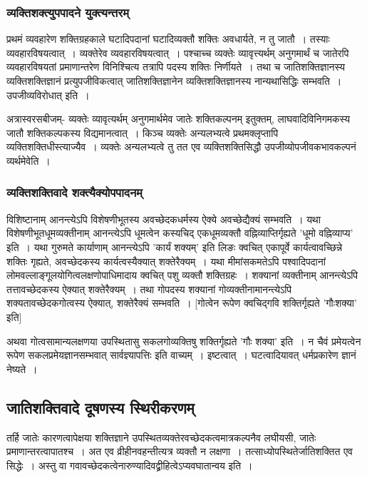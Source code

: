 			\subsubsection{व्यक्तिशक्त्युपपादने युक्त्यन्तरम्}

				प्रथमं व्यवहारेण शक्तिग्रहकाले घटादिपदानां घटादिव्यक्तौ शक्तिः अवधार्यते, न तु जातौ~। तस्याः व्यवहारविषयत्वात्~। व्यक्तेरेव व्यवहारविषयत्वात्~। पश्चाच्च व्यक्तेः व्यावृत्त्यर्थम् अनुगमार्थं च जातेरपि व्यवहारविषयतां प्रमाणान्तरेण विनिश्चित्य तत्रापि पदस्य शक्तिः निर्णीयते~। तथा च जातिशक्तिज्ञानस्य व्यक्तिशक्तिज्ञानं प्रत्युपजीविकत्वात् जातिशक्तिज्ञानेन व्यक्तिशक्तिज्ञानस्य नान्यथासिद्धिः सम्भवति~। उपजीव्यविरोधात् इति~। 

				अत्रास्वरसबीजम्- व्यक्तेः व्यावृत्यर्थम् अनुगमार्थमेव जातेः शक्तिकल्पनम् इतुक्तम्, लाघवादिविनिगमकस्य जातौ शक्तिकल्पकस्य विद्यमानत्वात्~। किञ्च व्यक्तेः अन्यलभ्यत्वे प्रथमक्लृप्तापि व्यक्तिशक्तिधीस्त्याज्यैव~। व्यक्तेः अन्यलभ्यत्वे तु तत एव व्यक्तिशक्तिसिद्धौ उपजीव्योपजीवकभावकल्पनं व्यर्थमेवेति~। 

			\subsubsection{व्यक्तिशक्तिवादे शक्त्यैक्योपपादनम्}

				विशिष्टानाम् आनन्त्येऽपि विशेषणीभूतस्य अवच्छेदकधर्मस्य ऐक्ये अवच्छेद्यैक्यं सम्भवति~। यथा विशेषणीभूतधूमव्यक्तीनाम् आनन्त्येऽपि धूमत्वेन कस्यचिद् एकधूमव्यक्तौ वह्निव्याप्तिर्गृह्यते 'धूमो वह्निव्याप्य' इति~। यथा गुरुमते कार्याणाम् आनन्त्येऽपि 'कार्यं शक्यम्' इति लिङः क्वचित् एकापूर्वे कार्यत्वावच्छिन्ने शक्तिः गृह्यते, अवच्छेदकस्य कार्यत्वस्यैक्यात् शक्तेरैक्यम्~। यथा मीमांसकमतेऽपि पश्वादिपदानां लोमवल्लाङ्गूलयोगित्वलक्षणोपाधिमादाय क्वचित् पशु व्यक्तौ शक्तिग्रहः~। शक्यानां व्यक्तीनाम् आनन्त्येऽपि तत्तावच्छेदकस्य ऐक्यात् शक्तेरैक्यम्~। तथा गोपदस्य शक्यानां गोव्यक्तीनामानन्त्येऽपि शक्यतावच्छेदकगोत्वस्य ऐक्यात्, शक्तेरैक्यं सम्भवति~। [गोत्वेन रूपेण क्वचिद्गवि शक्तिर्गृह्यते 'गौःशक्या' इति] 

				अथवा गोत्वसामान्यलक्षणया उपस्थितासु सकलगोव्यक्तिषु शक्तिर्गृह्यते 'गौः शक्या' इति~। न चैवं प्रमेयत्वेन रूपेण सकलप्रमेयज्ञानसम्भवात् सार्वज्ञ्यापत्तिः इति वाच्यम्~। इष्टत्वात्~। घटत्वादियावत्  धर्मप्रकारेण ज्ञानं नेष्यते~।

		\subsection{जातिशक्तिवादे दूषणस्य स्थिरीकरणम्}

			\begin{small}

				तर्हि जातेः कारणत्वापेक्षया शक्तिज्ञाने उपस्थितव्यक्तेरवच्छेदकत्वमात्रकल्पनैव लघीयसी, जातेः प्रमाणान्तरत्वापातश्च~। अत एव व्रीहीनवहन्तीत्यत्र व्यक्तौ न लक्षणा~। तत्साध्योपस्थितेर्जातिशक्तित एव सिद्धेः~। अस्तु वा गवावच्छेदकत्वेनारुण्यादिवद्व्रीहित्वेऽप्यवघातान्वय इति~। 
			\end{small}

